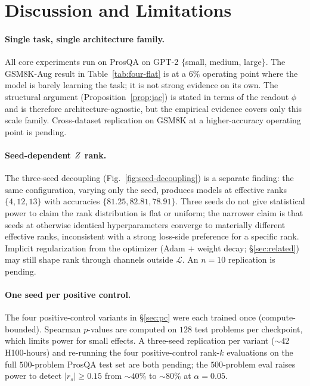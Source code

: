 \section{Discussion and Limitations}
\label{sec:discussion}

\paragraph{Single task, single architecture family.} All core
experiments run on ProsQA \citep{hao2024coconut} on GPT-2
$\{$small, medium, large$\}$. The GSM8K-Aug result in
Table~\ref{tab:four-flat} is at a $6\%$ operating point where the
model is barely learning the task; it is not strong evidence on
its own. The structural argument
(Proposition~\ref{prop:jac}) is stated in terms of the readout
$\phi$ and is therefore architecture-agnostic, but the empirical
evidence covers only this scale family. Cross-dataset replication
on GSM8K at a higher-accuracy operating point is pending.

\paragraph{Seed-dependent $Z$ rank.} The three-seed decoupling
(Fig.~\ref{fig:seed-decoupling}) is a separate finding: the same
configuration, varying only the seed, produces models at effective
ranks $\{4, 12, 13\}$ with accuracies $\{81.25, 82.81, 78.91\}$.
Three seeds do not give statistical power to claim the rank
distribution is flat or uniform; the narrower claim is that seeds
at otherwise identical hyperparameters converge to materially
different effective ranks, inconsistent with a strong loss-side
preference for a specific rank. Implicit regularization from the
optimizer (Adam $+$ weight decay; \S\ref{sec:related}) may still
shape rank through channels outside $\mathcal{L}$. An $n\!=\!10$
replication is pending.

\paragraph{One seed per positive control.} The four
positive-control variants in \S\ref{sec:pc} were each trained once
(compute-bounded). Spearman $p$-values are computed on $128$ test
problems per checkpoint, which limits power for small effects. A
three-seed replication per variant ($\sim\!42$ H100-hours) and
re-running the four positive-control rank-$k$ evaluations on the
full $500$-problem ProsQA test set are both pending; the
$500$-problem eval raises power to detect $|r_s|\!\geq\!0.15$ from
$\sim\!40\%$ to $\sim\!80\%$ at $\alpha\!=\!0.05$.

